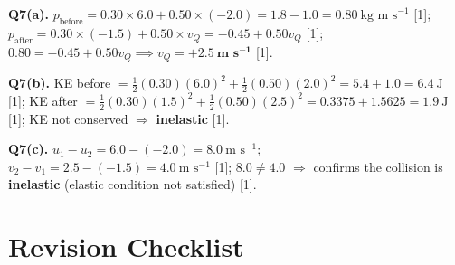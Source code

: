 \begin{markscheme}
\vspace{0.5em}\textbf{Q7(a).} $p_{\text{before}} = 0.30\times6.0 + 0.50\times(-2.0) = 1.8 - 1.0 = 0.80\ \text{kg m s}^{-1}$ [1]; $p_{\text{after}} = 0.30\times(-1.5) + 0.50\times v_Q = -0.45 + 0.50v_Q$ [1]; $0.80 = -0.45 + 0.50v_Q \implies v_Q = \mathbf{+2.5\ \text{m s}^{-1}}$ [1].

\vspace{0.5em}\textbf{Q7(b).} KE before $= \tfrac{1}{2}(0.30)(6.0)^2 + \tfrac{1}{2}(0.50)(2.0)^2 = 5.4 + 1.0 = 6.4\ \text{J}$ [1]; KE after $= \tfrac{1}{2}(0.30)(1.5)^2 + \tfrac{1}{2}(0.50)(2.5)^2 = 0.3375 + 1.5625 = 1.9\ \text{J}$ [1]; KE not conserved $\Rightarrow$ \textbf{inelastic} [1].

\vspace{0.5em}\textbf{Q7(c).} $u_1 - u_2 = 6.0 - (-2.0) = 8.0\ \text{m s}^{-1}$; $v_2 - v_1 = 2.5 - (-1.5) = 4.0\ \text{m s}^{-1}$ [1]; $8.0 \neq 4.0$ $\Rightarrow$ confirms the collision is \textbf{inelastic} (elastic condition not satisfied) [1].

\end{markscheme}

\newpage
\section{Revision Checklist}

